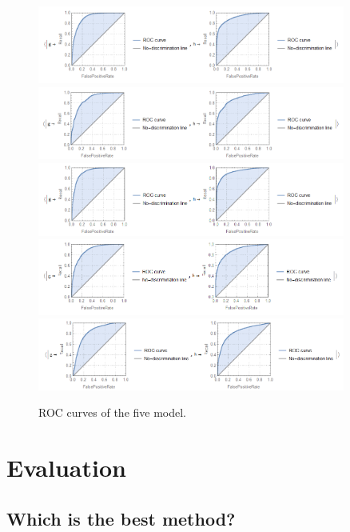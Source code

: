 \documentclass[a4paper, 12pt]{report}
\theoremstyle{definition}
\begin{document}
\begin{figure}[p]
  \centering
  \includegraphics[width=0.9\textwidth]{models/nn3.png}
  \includegraphics[width=0.9\textwidth]{models/dt3.png}
  \includegraphics[width=0.9\textwidth]{models/rf3.png}
  \includegraphics[width=0.9\textwidth]{models/knn3.png}
  \includegraphics[width=0.9\textwidth]{models/lr3.png}
  \caption{ROC curves of the five model.}
\end{figure}

\chapter{Evaluation}

\section{Which is the best method?}
\end{document}
